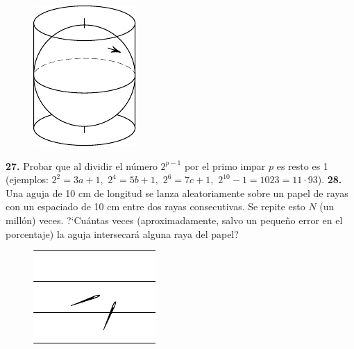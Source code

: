 \documentclass[12pt]{article}  %
\begin{document}
\begin{figure}[h]
\centering
\footnotesize
\includegraphics[scale=1]{taskbook-10}
\end{figure}

\newpage
\noindent
{\bf 27.} Probar que al dividir el n\'umero $2^{p-1}$ por el primo impar $p$ es resto es 1
(ejemplos: $2^2 = 3a +1,$ $2^4 = 5b+1,$ $2^6 = 7c+1,$ 
$2^{10} - 1 = 1023 = 11\cdot 93$).  
\newline\newline\quad
{\bf 28.} Una aguja de 10 cm de longitud se lanza aleatoriamente sobre un papel de rayas con un espaciado de 10 cm entre dos rayas consecutivas. 
Se repite esto $N$ (un mill\'on) veces. 
?`Cu\'antas veces (aproximadamente, salvo un peque\~no error en el porcentaje) la aguja intersecar\'a alguna raya del papel?
\begin{figure}[h]
\centering
\footnotesize
\includegraphics[scale=1]{taskbook-12}
\end{figure}
\end{document}
